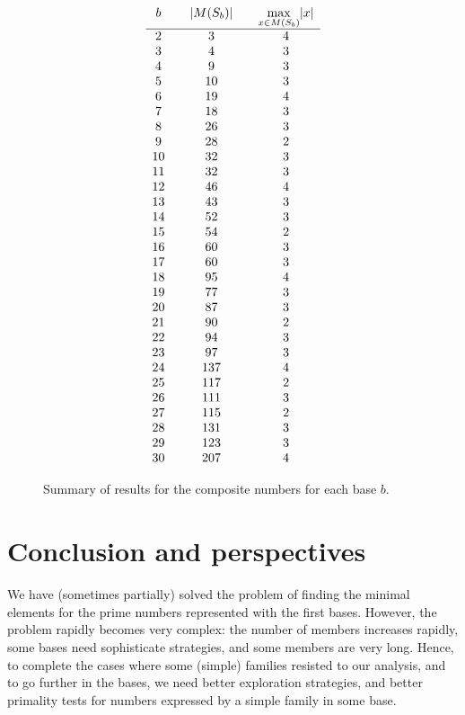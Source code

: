 \documentclass[12pt]{article}
\theoremstyle{plain}
\theoremstyle{definition}
\theoremstyle{remark}
\newcommand{\0}{\mathtt{0}}
\newcommand{\1}{\mathtt{1}}
\newcommand{\2}{\mathtt{2}}
\newcommand{\3}{\mathtt{3}}
\newcommand{\4}{\mathtt{4}}
\newcommand{\5}{\mathtt{5}}
\newcommand{\6}{\mathtt{6}}
\newcommand{\7}{\mathtt{7}}
\newcommand{\8}{\mathtt{8}}
\newcommand{\9}{\mathtt{9}}
\begin{document}
\begin{figure}\[\begin{array}{c@{\qquad}c@{\qquad}c}
b & \lvert M(S_b)\rvert & \max\limits_{x\in M(S_b)}\lvert x\rvert \\ \hline
2 & 3 & 4 \\
3 & 4 & 3 \\
4 & 9 & 3 \\
5 & 10 & 3 \\
6 & 19 & 4 \\
7 & 18 & 3\\
8 & 26 & 3 \\
9 & 28 & 2 \\
10 & 32 & 3 \\
11 & 32 & 3\\
12 & 46 & 4 \\
13 & 43 & 3 \\
14 & 52 & 3 \\
15 & 54 & 2 \\
16 & 60 & 3 \\
17 & 60 & 3 \\
18 & 95 & 4 \\
19 & 77 & 3 \\
20 & 87 & 3 \\
21 & 90 & 2 \\
22 & 94 & 3 \\
23 & 97 & 3 \\
24 & 137 & 4 \\
25 & 117 & 2 \\
26 & 111 & 3 \\
27 & 115 & 2 \\
28 & 131 & 3 \\
29 & 123 & 3 \\
30 & 207 & 4
\end{array}\]
\caption{Summary of results for the composite numbers for each base $b$.}
\label{ttwo}
\end{figure}

\section{Conclusion and perspectives}

We have (sometimes partially) solved the problem of finding the minimal elements for the prime numbers
represented with the first bases. However, the problem rapidly becomes very complex: the number of members
increases rapidly, some bases need sophisticate strategies, and some members are very long.
Hence, to complete the cases where some (simple) families resisted to our analysis, and to go further in the bases,
we need better exploration strategies, and better primality tests for numbers expressed by a simple family in some base.
\end{document}
